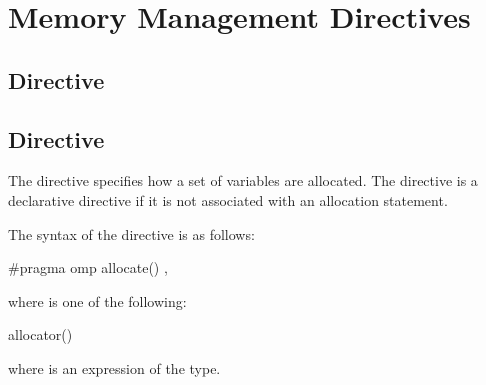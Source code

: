 \section{Memory Management Directives}
\label{sec:Memory Management Directives}

\subsection{ Directive}
\label{subsec:declare alloc Directive}

\summary

\syntax

\descr

\subsection{ Directive}
\label{subsec:allocate Directive}
\summary
 
The  directive specifies how a set of variables are allocated. The  directive is a declarative directive if it is not associated with an allocation statement.
 
\syntax
\begin{ccppspecific}
The syntax of the  directive is as follows:

\begin{boxedcode}
\#pragma omp allocate() \plc{[clause[ [ [},\plc{] clause] ... ]] new-line}
\end{boxedcode}

where  is one of the following:

\begin{indentedcodelist}
allocator()
\end{indentedcodelist}

where  is an expression of the  type.
\end{ccppspecific}
\medskip


